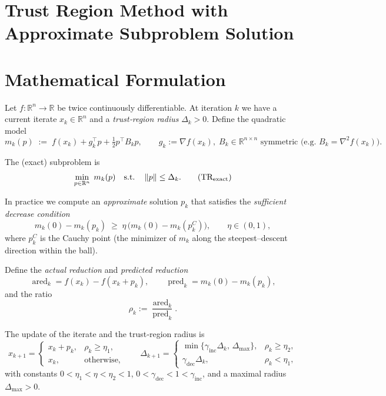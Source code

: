 \documentclass{article}
\newcommand{\norm}[1]{\left\lVert #1\right\rVert}
\newcommand{\R}{\mathbb{R}}
\begin{document}
\section*{Trust Region Method with Approximate Subproblem Solution}

\section*{Mathematical Formulation}
Let $f:\R^{n}\rightarrow\R$ be twice continuously differentiable.  
At iteration $k$ we have a current iterate $x_{k}\in\R^{n}$ and a \emph{trust‐region radius} $\Delta_{k}>0$.  
Define the quadratic model
\[
m_{k}(p)\;:=\;f(x_{k})+g_{k}^{\top}p+\tfrac12 p^{\top}B_{k}p,
\qquad 
g_{k}:=\nabla f(x_{k}),\;
B_{k}\in\R^{n\times n}\text{ symmetric (e.g. }B_{k}= \nabla^{2}f(x_{k})\text{)} .
\]

The (exact) subproblem is
\[
\min_{p\in\R^{n}}\; m_{k}(p)\quad\text{s.t.}\quad \norm{p}\le \Delta_{k}. \tag{TR$_{\text{exact}}$}
\]

In practice we compute an \emph{approximate} solution $p_{k}$ that satisfies the
\emph{sufficient decrease condition}
\[
m_{k}(0)-m_{k}(p_{k})\;\ge\;\eta\,
\bigl(m_{k}(0)-m_{k}(p_{k}^{C})\bigr),\qquad \eta\in(0,1), \tag{1}
\]
where $p_{k}^{C}$ is the Cauchy point (the minimizer of $m_{k}$ along the steepest–descent direction within the ball).

Define the \emph{actual reduction} and \emph{predicted reduction}
\[
\operatorname{ared}_{k}=f(x_{k})-f(x_{k}+p_{k}),\qquad
\operatorname{pred}_{k}=m_{k}(0)-m_{k}(p_{k}),
\]
and the ratio
\[
\rho_{k}:=\frac{\operatorname{ared}_{k}}{\operatorname{pred}_{k}}.\tag{2}
\]

The update of the iterate and the trust‑region radius is
\[
x_{k+1}= \begin{cases}
x_{k}+p_{k}, & \rho_{k}\ge \eta_{1},\\[4pt]
x_{k},      & \text{otherwise},
\end{cases}\qquad
\Delta_{k+1}= \begin{cases}
\min\{\gamma_{\text{inc}}\Delta_{k},\,\Delta_{\max}\}, & \rho_{k}\ge \eta_{2},\\[4pt]
\gamma_{\text{dec}}\Delta_{k}, & \rho_{k}<\eta_{1},
\end{cases} \tag{3}
\]
with constants $0<\eta_{1}<\eta<\eta_{2}<1$, $0<\gamma_{\text{dec}}<1<\gamma_{\text{inc}}$, and a maximal radius $\Delta_{\max}>0$.
\end{document}
